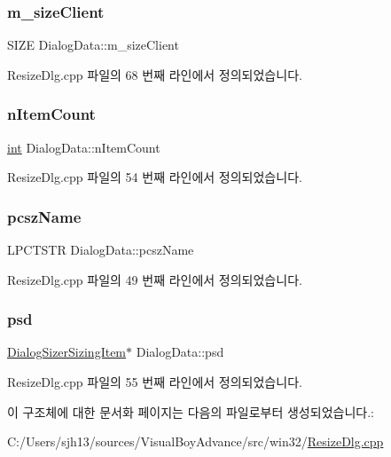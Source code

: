 \subsubsection{\texorpdfstring{m\+\_\+size\+Client}{m\_sizeClient}}
{\footnotesize\ttfamily S\+I\+ZE Dialog\+Data\+::m\+\_\+size\+Client}



Resize\+Dlg.\+cpp 파일의 68 번째 라인에서 정의되었습니다.

\mbox{\label{struct_dialog_data_acd196414db13af6456bbb413f2d1fa7d}} 
\subsubsection{\texorpdfstring{n\+Item\+Count}{nItemCount}}
{\footnotesize\ttfamily \mbox{\hyperlink{_util_8cpp_a0ef32aa8672df19503a49fab2d0c8071}{int}} Dialog\+Data\+::n\+Item\+Count}



Resize\+Dlg.\+cpp 파일의 54 번째 라인에서 정의되었습니다.

\mbox{\label{struct_dialog_data_a6ab5be3a7126b6f9b5fcb7131fcf2909}} 
\subsubsection{\texorpdfstring{pcsz\+Name}{pcszName}}
{\footnotesize\ttfamily L\+P\+C\+T\+S\+TR Dialog\+Data\+::pcsz\+Name}



Resize\+Dlg.\+cpp 파일의 49 번째 라인에서 정의되었습니다.

\mbox{\label{struct_dialog_data_aefb399f16dab34e6a2da67716d6147fc}} 
\subsubsection{\texorpdfstring{psd}{psd}}
{\footnotesize\ttfamily \mbox{\hyperlink{struct_dialog_sizer_sizing_item}{Dialog\+Sizer\+Sizing\+Item}}$\ast$ Dialog\+Data\+::psd}



Resize\+Dlg.\+cpp 파일의 55 번째 라인에서 정의되었습니다.



이 구조체에 대한 문서화 페이지는 다음의 파일로부터 생성되었습니다.\+:\begin{DoxyCompactItemize}
\item 
C\+:/\+Users/sjh13/sources/\+Visual\+Boy\+Advance/src/win32/\mbox{\hyperlink{_resize_dlg_8cpp}{Resize\+Dlg.\+cpp}}\end{DoxyCompactItemize}
